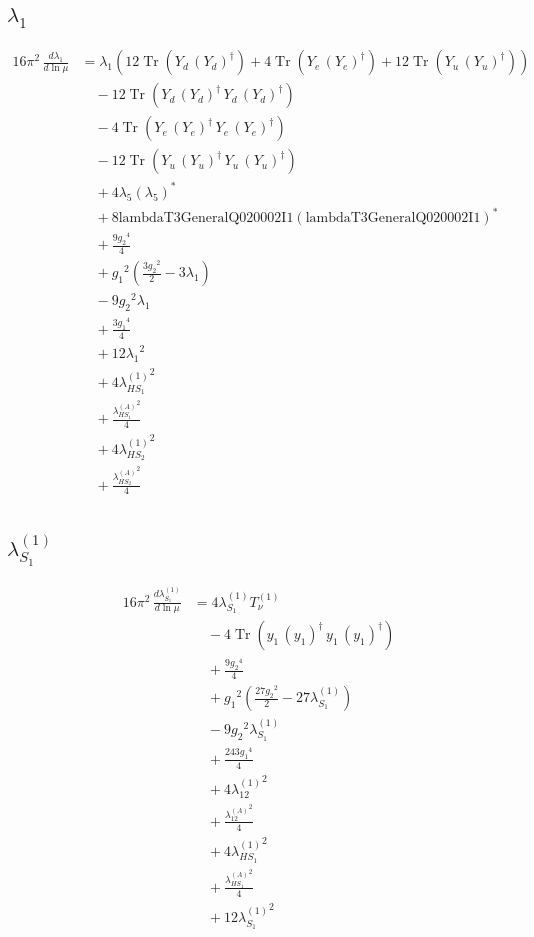 \documentclass[10pt,a4paper]{article}
\begin{document}
\subsection*{$\lambda_1$}
\begin{align*}
16\pi^2\,\frac{d \lambda_1}{d\ln\mu} &={\lambda_1} (12 \operatorname{Tr}\!\left({Y_d}\,\left({Y_d}\right)^{\dagger}\right)+4 \operatorname{Tr}\!\left({Y_e}\,\left({Y_e}\right)^{\dagger}\right)+12 \operatorname{Tr}\!\left({Y_u}\,\left({Y_u}\right)^{\dagger}\right)) \\
&\quad -12 \operatorname{Tr}\!\left({Y_d}\,\left({Y_d}\right)^{\dagger}\,{Y_d}\,\left({Y_d}\right)^{\dagger}\right) \\
&\quad -4 \operatorname{Tr}\!\left({Y_e}\,\left({Y_e}\right)^{\dagger}\,{Y_e}\,\left({Y_e}\right)^{\dagger}\right) \\
&\quad -12 \operatorname{Tr}\!\left({Y_u}\,\left({Y_u}\right)^{\dagger}\,{Y_u}\,\left({Y_u}\right)^{\dagger}\right) \\
&\quad +4 {\lambda_5} \left({\lambda_5}\right)^{*} \\
&\quad +8 \text{lambdaT3GeneralQ020002I1} \left(\text{lambdaT3GeneralQ020002I1}\right)^{*} \\
&\quad +\frac{9 {g_2}^4}{4} \\
&\quad +{g_1}^2 \left(\frac{3 {g_2}^2}{2}-3 {\lambda_1}\right) \\
&\quad -9 {g_2}^2 {\lambda_1} \\
&\quad +\frac{3 {g_1}^4}{4} \\
&\quad +12 {\lambda_1}^2 \\
&\quad +4 {\lambda_{HS_1}^{(1)}}^2 \\
&\quad +\frac{{\lambda_{HS_1}^{(A)}}^2}{4} \\
&\quad +4 {\lambda_{HS_2}^{(1)}}^2 \\
&\quad +\frac{{\lambda_{HS_2}^{(A)}}^2}{4} \\
\end{align*}
\subsection*{$\lambda_{S_1}^{(1)}$}
\begin{align*}
16\pi^2\,\frac{d \lambda_{S_1}^{(1)}}{d\ln\mu} &=4 {\lambda_{S_1}^{(1)}} T_{\nu}^{(1)} \\
&\quad -4 \operatorname{Tr}\!\left({y_1}\,\left({y_1}\right)^{\dagger}\,{y_1}\,\left({y_1}\right)^{\dagger}\right) \\
&\quad +\frac{9 {g_2}^4}{4} \\
&\quad +{g_1}^2 \left(\frac{27 {g_2}^2}{2}-27 {\lambda_{S_1}^{(1)}}\right) \\
&\quad -9 {g_2}^2 {\lambda_{S_1}^{(1)}} \\
&\quad +\frac{243 {g_1}^4}{4} \\
&\quad +4 {\lambda_{12}^{(1)}}^2 \\
&\quad +\frac{{\lambda_{12}^{(A)}}^2}{4} \\
&\quad +4 {\lambda_{HS_1}^{(1)}}^2 \\
&\quad +\frac{{\lambda_{HS_1}^{(A)}}^2}{4} \\
&\quad +12 {\lambda_{S_1}^{(1)}}^2 \\
\end{align*}
\end{document}
